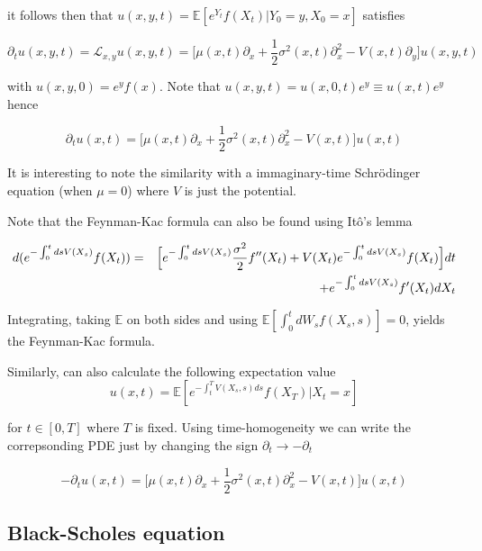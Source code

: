 \documentclass[11pt,a4paper]{article}
\begin{document}
it follows then that $u(x,y,t) = \mathbb{E}[e^{Y_t}f(X_t)|Y_0 = y,X_0=x]$ satisfies

\begin{equation}
    \partial_t u(x,y,t) = \mathcal{L}_{x,y}u(x,y,t) = \Biggl[\mu(x,t)\partial_x + \frac{1}{2}\sigma^{2}(x,t)\partial^2_x-V(x,t)\partial_y\Biggl]u(x,y,t)
\end{equation}

with $u(x,y,0) = e^yf(x)$. Note that $u(x,y,t) = u(x,0,t)e^{y} \equiv u(x,t)e^y$ hence 

\begin{equation}
    \partial_t u(x,t) =  \Biggl[\mu(x,t)\partial_x + \frac{1}{2}\sigma^{2}(x,t)\partial^2_x-V(x,t)\Biggl]u(x,t)
\end{equation}

It is interesting to note the similarity with a immaginary-time Schr\"{o}dinger equation (when $\mu=0$) where $V$ is just the potential.

Note that the Feynman-Kac formula can also be found using It\^{o}'s lemma

\begin{eqnarray}
    d(e^{-\int_{0}^tdsV(X_s)}f(X_t)) &=& \Bigl[e^{-\int_{0}^tdsV(X_s)}\frac{\sigma^2}{2}f''(X_t)+V(X_t)e^{-\int_{0}^tdsV(X_s)}f(X_t)\Bigl]dt \nonumber \\
    &\phantom{=}& + e^{-\int_{0}^tdsV(X_s)}f'(X_t)dX_t
\end{eqnarray}

Integrating, taking $\mathbb{E}$ on both sides and using $\mathbb{E}[\int_{0}^t dW_s f(X_s,s)] = 0$, yields the Feynman-Kac formula.

Similarly, can also calculate the following expectation value
\begin{equation}
    u(x,t) = \mathbb{E}[e^{-\int_{t}^T V(X_s,s)ds}f(X_T)|X_t=x]
\end{equation}

for $t\in [0,T]$ where $T$ is fixed. Using time-homogeneity we can write the correpsonding PDE just by changing the sign $\partial_t \to -\partial_t$

\begin{equation}
    -\partial_t u(x,t) =  \Biggl[\mu(x,t)\partial_x + \frac{1}{2}\sigma^{2}(x,t)\partial^2_x-V(x,t)\Biggl]u(x,t)
\end{equation}


\subsection{Black-Scholes equation}
\end{document}
